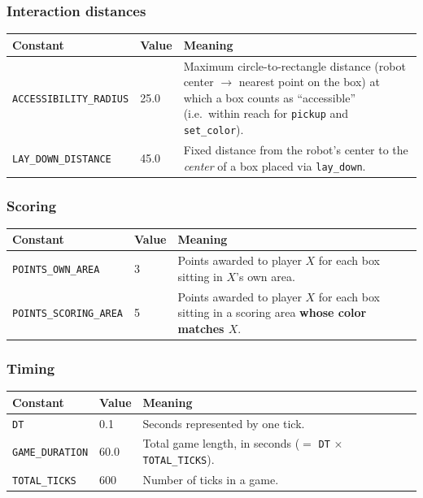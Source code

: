 \documentclass[11pt,a4paper]{article}
\newcommand{\code}[1]{\texttt{#1}}
\newcommand{\func}[1]{\texttt{#1}}
\begin{document}
\subsubsection*{Interaction distances}
\begin{longtable}{p{4.7cm}p{2cm}p{8cm}}
\toprule
\textbf{Constant} & \textbf{Value} & \textbf{Meaning} \\
\midrule
\endhead
\code{ACCESSIBILITY\_RADIUS} & 25.0 & Maximum circle-to-rectangle distance
    (robot center $\to$ nearest point on the box) at which a box counts as
    ``accessible'' (i.e.\ within reach for \func{pickup} and
    \func{set\_color}). \\
\code{LAY\_DOWN\_DISTANCE} & 45.0 & Fixed distance from the robot's center
    to the \emph{center} of a box placed via \func{lay\_down}. \\
\bottomrule
\end{longtable}

\subsubsection*{Scoring}
\begin{longtable}{p{4.7cm}p{2cm}p{8cm}}
\toprule
\textbf{Constant} & \textbf{Value} & \textbf{Meaning} \\
\midrule
\endhead
\code{POINTS\_OWN\_AREA} & 3 & Points awarded to player $X$ for each box
    sitting in $X$'s own area. \\
\code{POINTS\_SCORING\_AREA} & 5 & Points awarded to player $X$ for each
    box sitting in a scoring area \textbf{whose color matches $X$}. \\
\bottomrule
\end{longtable}

\subsubsection*{Timing}
\begin{longtable}{p{4.7cm}p{2cm}p{8cm}}
\toprule
\textbf{Constant} & \textbf{Value} & \textbf{Meaning} \\
\midrule
\endhead
\code{DT} & 0.1 & Seconds represented by one tick. \\
\code{GAME\_DURATION} & 60.0 & Total game length, in seconds
    ($= $ \code{DT} $\times$ \code{TOTAL\_TICKS}). \\
\code{TOTAL\_TICKS} & 600 & Number of ticks in a game. \\
\bottomrule
\end{longtable}
\end{document}
